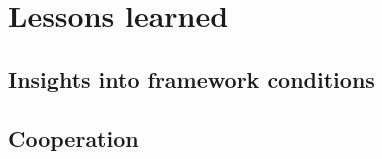 \section{Lessons learned}\label{sec:lessons-learned}

\subsection{Insights into framework conditions}\label{subsec:insights-into-framework-conditions}


\subsection{Cooperation}\label{subsec:cooperation}



